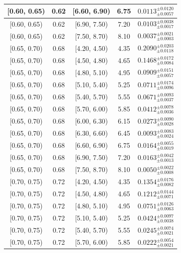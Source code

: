 \begin{longtable}{|c|c|c|c|c|}
\hline
[0.60, 0.65) & 0.62 & [6.60, 6.90) & 6.75 & $0.0113^{ \pm 0.0120 }_{ \pm 0.0057 }$ \\ 
\hline
[0.60, 0.65) & 0.62 & [6.90, 7.50) & 7.20 & $0.0103^{ \pm 0.0038 }_{ \pm 0.0017 }$ \\ 
\hline
[0.60, 0.65) & 0.62 & [7.50, 8.70) & 8.10 & $0.0037^{ \pm 0.0021 }_{ \pm 0.0003 }$ \\ 
\hline
[0.65, 0.70) & 0.68 & [4.20, 4.50) & 4.35 & $0.2090^{ \pm 0.0203 }_{ \pm 0.0118 }$ \\ 
\hline
[0.65, 0.70) & 0.68 & [4.50, 4.80) & 4.65 & $0.1468^{ \pm 0.0172 }_{ \pm 0.0084 }$ \\ 
\hline
[0.65, 0.70) & 0.68 & [4.80, 5.10) & 4.95 & $0.0909^{ \pm 0.0151 }_{ \pm 0.0057 }$ \\ 
\hline
[0.65, 0.70) & 0.68 & [5.10, 5.40) & 5.25 & $0.0711^{ \pm 0.0174 }_{ \pm 0.0096 }$ \\ 
\hline
[0.65, 0.70) & 0.68 & [5.40, 5.70) & 5.55 & $0.0671^{ \pm 0.0093 }_{ \pm 0.0037 }$ \\ 
\hline
[0.65, 0.70) & 0.68 & [5.70, 6.00) & 5.85 & $0.0412^{ \pm 0.0078 }_{ \pm 0.0036 }$ \\ 
\hline
[0.65, 0.70) & 0.68 & [6.00, 6.30) & 6.15 & $0.0273^{ \pm 0.0090 }_{ \pm 0.0028 }$ \\ 
\hline
[0.65, 0.70) & 0.68 & [6.30, 6.60) & 6.45 & $0.0093^{ \pm 0.0083 }_{ \pm 0.0024 }$ \\ 
\hline
[0.65, 0.70) & 0.68 & [6.60, 6.90) & 6.75 & $0.0164^{ \pm 0.0055 }_{ \pm 0.0019 }$ \\ 
\hline
[0.65, 0.70) & 0.68 & [6.90, 7.50) & 7.20 & $0.0163^{ \pm 0.0042 }_{ \pm 0.0013 }$ \\ 
\hline
[0.65, 0.70) & 0.68 & [7.50, 8.70) & 8.10 & $0.0050^{ \pm 0.0022 }_{ \pm 0.0008 }$ \\ 
\hline
[0.70, 0.75) & 0.72 & [4.20, 4.50) & 4.35 & $0.1354^{ \pm 0.0176 }_{ \pm 0.0082 }$ \\ 
\hline
[0.70, 0.75) & 0.72 & [4.50, 4.80) & 4.65 & $0.1212^{ \pm 0.0144 }_{ \pm 0.0071 }$ \\ 
\hline
[0.70, 0.75) & 0.72 & [4.80, 5.10) & 4.95 & $0.0751^{ \pm 0.0126 }_{ \pm 0.0063 }$ \\ 
\hline
[0.70, 0.75) & 0.72 & [5.10, 5.40) & 5.25 & $0.0424^{ \pm 0.0097 }_{ \pm 0.0038 }$ \\ 
\hline
[0.70, 0.75) & 0.72 & [5.40, 5.70) & 5.55 & $0.0245^{ \pm 0.0074 }_{ \pm 0.0021 }$ \\ 
\hline
[0.70, 0.75) & 0.72 & [5.70, 6.00) & 5.85 & $0.0222^{ \pm 0.0054 }_{ \pm 0.0021 }$ \\ 

\end{longtable}
